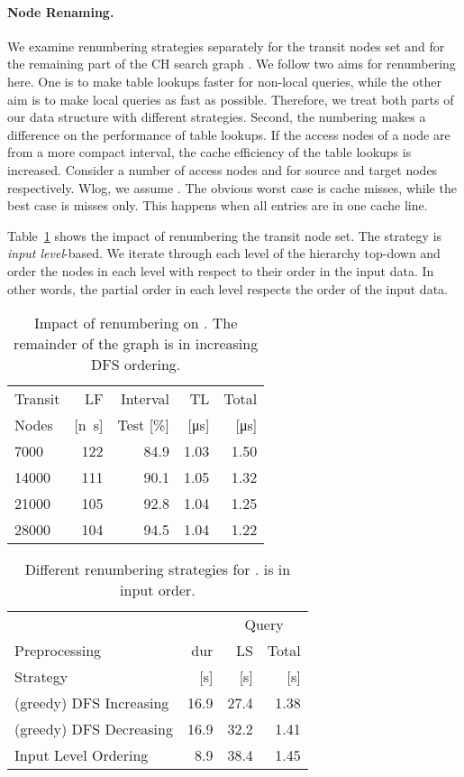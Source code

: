 \documentclass{llncs}
\begin{document}
\paragraph{Node Renaming.}
We examine renumbering strategies separately for the transit nodes set   and for the remaining part of the CH search graph .
We follow two aims for renumbering here.
One is to make table lookups faster for non-local queries, while the other aim is to make local queries as fast as possible.
Therefore, we treat both parts of our data structure with different strategies.
Second, the numbering makes a difference on the performance of table lookups. 
If the access nodes of a node are from a more compact interval, the cache efficiency of the table lookups is increased. 
Consider a number of access nodes  and  for source and target nodes respectively.
Wlog, we assume .
The obvious worst case is  cache misses, while the best case is  misses only.
This happens when all  entries are in one cache line. 

Table~\ref{tab:RenamingTransit} shows the impact of renumbering the transit node set. 
The strategy is \emph{input level}-based.
We iterate through each level of the hierarchy top-down and order the nodes in each level with respect to their order in the  input data.
In other words, the partial order in each level respects the order of the input data.

\begin{table}[b]
\caption{Impact of renumbering on . The remainder of the graph is in increasing DFS ordering.}
\label{tab:RenamingTransit}
\centering
\begin{tabular}{lrrrr}
\toprule
Transit & LF & Interval & TL & Total \\
Nodes & [\si{n\second}] & Test [\%] & [\si{\micro\second}] & [\si{\micro\second}] \\
\midrule
7000 	& 122 & 84.9 & 1.03 & 1.50 \\
14000 & 111 & 90.1 & 1.05 & 1.32 \\
21000 & 105 & 92.8 & 1.04 & 1.25 \\
28000 & 104 & 94.5 & 1.04 & 1.22 \\
\bottomrule 
\end{tabular}
\end{table}

\begin{table}[tb]
\caption{Different renumbering strategies for .  is in input order.}
\label{tab:RenamingNonTransit}
\centering
\begin{tabular}{lrrr}
\toprule
 &	 & \multicolumn{2}{c}{Query} \\
 		\cmidrule(lr){2-2} \cmidrule(lr){3-4}
Preprocessing & dur & LS & Total\\
Strategy & [s] & [s] & [s]\\
\midrule
(greedy) DFS Increasing	& 16.9 	& 27.4 & 1.38 \\  
(greedy) DFS Decreasing	& 16.9 	& 32.2 & 1.41 \\ 
Input Level Ordering	& 8.9 & 38.4 & 1.45 \\ 
\bottomrule 
\end{tabular}
\end{table}
\end{document}
